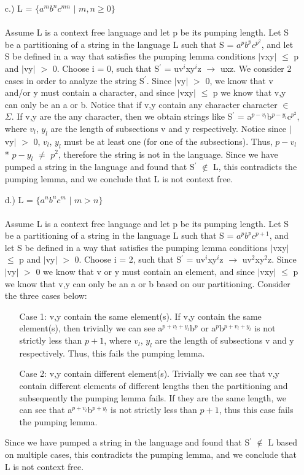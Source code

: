 \documentclass[12pt]{article}
\begin{document}
\begin{enumerate}
\begin{itemize}
	\item[c.)] L = $\{a^m b^n c^{mn}$ $|$ $m, n \geq 0 \}$ \\ \\
	Assume L is a context free language and let p be its pumping length. Let S be a partitioning of a string in the language L such that S = $a^pb^pc^{p^2}$, and let S be defined in a way that satisfies the pumping lemma conditions $|$vxy$|$ $\leq$ p and $|$vy$|$ $>$ 0.  Choose i = 0, such that S$^{'}$ = uv$^i$xy$^i$z $\rightarrow$ uxz. We consider 2 cases in order to analyze the string S$^{'}$. Since $|$vy$|$ $>$ 0, we know that v and/or y must contain a character, and since $|$vxy$|$ $\leq$ p we know that v,y can only be an a or b. Notice that if v,y contain any character character $\in$ $\Sigma$. If v,y are the any character, then we obtain strings like S$^{'}$ = a$^{p - v_l}$b$^{p - y_l}$c$^{p^2}$, where $v_l$, $y_l$ are the length of subsections v and y respectively. Notice since $|$vy$|$ $>$ 0, $v_l$, $y_l$ must be at least one (for one of the subsections). Thus, $p - v_l$ * $p - y_l$ $\not =$ $p^2$, therefore the string is not in the language. Since we have pumped a string in the language and found that S$^{'}$ $\not \in$ L, this contradicts the pumping lemma, and we conclude that L is not context free. \\
	
	\item[d.)] L = $\{a^n b^n c^m$ $|$ $m > n \}$ \\ \\
	Assume L is a context free language and let p be its pumping length. Let S be a partitioning of a string in the language L such that S = $a^pb^pc^{p+1}$, and let S be defined in a way that satisfies the pumping lemma conditions $|$vxy$|$ $\leq$ p and $|$vy$|$ $>$ 0. Choose i = 2, such that S$^{'}$ = uv$^i$xy$^i$z $\rightarrow$ uv$^2$xy$^2$z. Since $|$vy$|$ $>$ 0 we know that v or y must contain an element, and since $|$vxy$|$ $\leq$ p we know that v,y can only be an a or b based on our partitioning. Consider the three cases below:
	\begin{itemize}
		\item [Case 1:] v,y contain the same element(s). If v,y contain the same element(s), then trivially we can see a$^{p + v_l + y_l}$b$^{p}$ or a$^{p}$b$^{p + v_l + y_l}$ is not strictly less than $p+1$, where $v_l$, $y_l$ are the length of subsections v and y respectively. Thus, this fails the pumping lemma.
		\item [Case 2:] v,y contain different element(s). Trivially we can see that v,y contain different elements of different lengths then the partitioning and subsequently the pumping lemma fails. If they are the same length, we can see that a$^{p+v_l}$b$^{p+y_l}$ is not strictly less than $p+1$, thus this case fails the pumping lemma.
	\end{itemize}
	 Since we have pumped a string in the language and found that S$^{'}$ $\not \in$ L based on multiple cases, this contradicts the pumping lemma, and we conclude that L is not context free. \\	
	\end{itemize}
	

\end{enumerate}
\end{document}
